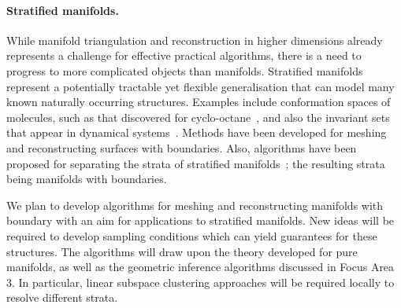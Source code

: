 \paragraph{Stratified manifolds.}

While manifold triangulation and reconstruction in higher dimensions
already represents a challenge for effective practical algorithms,
there is a need to progress to more complicated objects than
manifolds. Stratified manifolds represent a potentially tractable yet
flexible generalisation that can model many known naturally occurring
structures. Examples include conformation spaces of molecules, such as
that discovered for cyclo-octane~\cite{mtcw-tco-2010}, and also the
invariant sets that appear in dynamical systems~\cite{mh-mpc-2002}.
%
Methods have been developed for meshing and reconstructing surfaces
with boundaries. Also, algorithms have been proposed for separating
the strata of stratified manifolds~\cite{bendich2007}; the resulting
strata being manifolds with boundaries. 

We plan to develop algorithms for meshing and reconstructing manifolds
with boundary with an aim for applications to stratified
manifolds. 
New ideas will be required to develop sampling conditions which can
yield guarantees for these structures. The algorithms will draw upon
the theory developed for pure manifolds, as well as the geometric
inference algorithms discussed in Focus Area 3. In particular, linear
subspace clustering approaches will be required locally to resolve
different strata.
